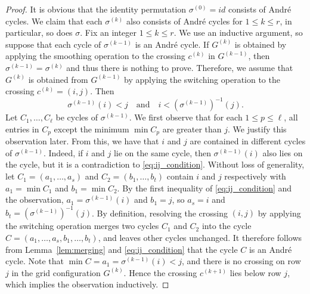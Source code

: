 \documentclass[reqno,12pt]{amsart}
\theoremstyle{definition}
\theoremstyle{remark}
\newcommand\qand{\quad\mbox{and}\quad}
\begin{document}
\begin{proof}
  It is obvious that the identity permutation \( \sigma^{(0)}=id \) consists of
  Andr\'e cycles. We claim that each \( \sigma^{(k)} \) also consists of Andr\'e cycles 
  for \( 1\le k\le r \), in particular, so does \( \sigma \).
  Fix an integer \( 1\le k\le r \).
  We use an inductive argument, so suppose that each cycle of \( \sigma^{(k-1)} \)
  is an Andr\'e cycle.
  If \( G^{(k)} \) is obtained by applying the smoothing operation to
  the crossing \( c^{(k)} \) in \( G^{(k-1)} \),
  then \( \sigma^{(k-1)}=\sigma^{(k)} \) and thus there is nothing to prove.
  Therefore, we assume that \( G^{(k)} \) is obtained from \( G^{(k-1)} \)
  by applying the switching operation to the crossing \( c^{(k)}=(i,j) \).
  Then 
  \begin{equation} \label{eq:ij_condition}
    \sigma^{(k-1)}(i)<j \qand i<(\sigma^{(k-1)})^{-1}(j).
  \end{equation}
  Let \( C_1, \dots, C_\ell \) be cycles of \( \sigma^{(k-1)} \).
  We first observe that for each \( 1\le p\le \ell \), all entries in \( C_p \)
  except the minimum \( \min C_p \) are greater than \( j \).
  We justify this observation later.
  From this, we have that \( i \) and \( j \) are contained in different cycles
  of \( \sigma^{(k-1)} \). Indeed, if \( i \) and \( j \) lie on the same cycle,
  then \( \sigma^{(k-1)}(i) \) also lies on the cycle, but it is a contradiction to
  \eqref{eq:ij_condition}.
  Without loss of generality, let \( C_1=(a_1,\dots,a_s) \) and
  \( C_2=(b_1,\dots,b_t) \) contain \( i \) and \( j \) respectively
  with \( a_1=\min C_1 \) and \( b_1 = \min C_2 \).
  By the first inequality of \eqref{eq:ij_condition} and the observation,
  \( a_1 = \sigma^{(k-1)}(i) \) and \( b_1 = j \), so \( a_s = i \) and
  \( b_t = (\sigma^{(k-1)})^{-1}(j) \).
  By definition, resolving the crossing \( (i,j) \) by applying the switching operation merges two cycles \( C_1 \) and
  \( C_2 \) into the cycle \( C=(a_1,\dots,a_s,b_1,\dots,b_t) \),
  and leaves other cycles unchanged.
  It therefore follows from Lemma~\ref{lem:merging} and \eqref{eq:ij_condition}
  that the cycle \( C \) is an Andr\'e cycle.
  Note that \( \min C = a_1 = \sigma^{(k-1)}(i) < j \), and there is no crossing on
  row \( j \) in the grid configuration \( G^{(k)} \).
  Hence the crossing \( c^{(k+1)} \) lies below row \( j \),
  which implies the observation inductively.


\end{proof}
\end{document}
